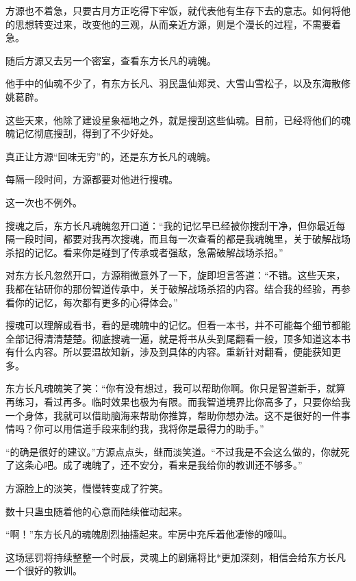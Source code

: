 
\begin{this_body}

方源也不着急，只要古月方正吃得下牢饭，就代表他有生存下去的意志。如何将他的思想转变过来，改变他的三观，从而亲近方源，则是个漫长的过程，不需要着急。

随后方源又去另一个密室，查看东方长凡的魂魄。

他手中的仙魂不少了，有东方长凡、羽民蛊仙郑灵、大雪山雪松子，以及东海散修姚葛辟。

这些天来，他除了建设星象福地之外，就是搜刮这些仙魂。目前，已经将他们的魂魄记忆彻底搜刮，得到了不少好处。

真正让方源“回味无穷”的，还是东方长凡的魂魄。

每隔一段时间，方源都要对他进行搜魂。

这一次也不例外。

搜魂之后，东方长凡魂魄忽开口道：“我的记忆早已经被你搜刮干净，但你最近每隔一段时间，都要对我再次搜魂，而且每一次查看的都是我魂魄里，关于破解战场杀招的记忆。看来你是碰到了传承或者强敌，急需破解战场杀招。”

对东方长凡忽然开口，方源稍微意外了一下，旋即坦言答道：“不错。这些天来，我都在钻研你的那份智道传承中，关于破解战场杀招的内容。结合我的经验，再参看你的记忆，每次都有更多的心得体会。”

搜魂可以理解成看书，看的是魂魄中的记忆。但看一本书，并不可能每个细节都能全部记得清清楚楚。彻底搜魂一遍，就是将书从头到尾翻看一般，顶多知道这本书有什么内容。所以要温故知新，涉及到具体的内容。重新针对翻看，便能获知更多。

东方长凡魂魄笑了笑：“你有没有想过，我可以帮助你啊。你只是智道新手，就算再练习，看过再多。临时效果也极为有限。而我智道境界比你高多了，只要你给我一个身体，我就可以借助脑海来帮助你推算，帮助你想办法。这不是很好的一件事情吗？你可以用信道手段来制约我，我将你是最得力的助手。”

“的确是很好的建议。”方源点点头，继而淡笑道。“不过我是不会这么做的，你就死了这条心吧。成了魂魄了，还不安分，看来是我给你的教训还不够多。”

方源脸上的淡笑，慢慢转变成了狞笑。

数十只蛊虫随着他的心意而陆续催动起来。

“啊！”东方长凡的魂魄剧烈抽搐起来。牢房中充斥着他凄惨的嚎叫。

这场惩罚将持续整整一个时辰，灵魂上的剧痛将比*更加深刻，相信会给东方长凡一个很好的教训。


\end{this_body}
